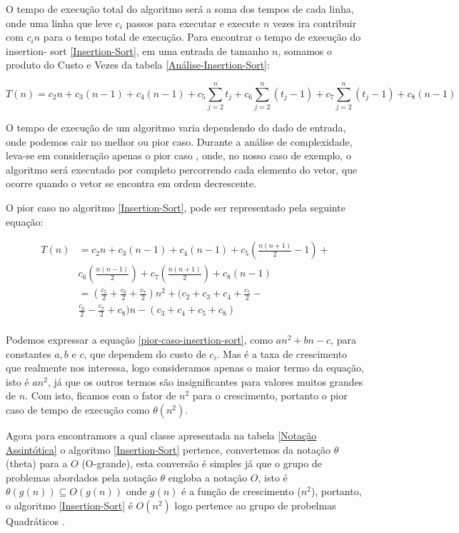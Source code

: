 \documentclass[
	12pt,				%
	openright,			%
	oneside,			%
	a4paper,			%
	english,			%
	brazil				%
	]{abntex2}
\begin{document}
O tempo de execução total do algoritmo será a soma dos tempos de cada linha, onde uma linha que leve $c_i$ passos para executar
e execute $n$ vezes ira contribuir com $c_in$ para o tempo total de execução. Para encontrar o tempo de execução do insertion-
sort \ref{Insertion-Sort}, em uma entrada de tamanho $n$, somamos o produto do Custo e Vezes da tabela \ref{Análise-Insertion-Sort}:

\begin{equation}
	\label{tempo-execução-insertion-sort}
	T(n) = c_2n + c_3(n - 1) + c_4(n - 1) + c_5\sum_{j=2}^{n} t_j + c_6\sum_{j=2}^{n} (t_j - 1) + c_7\sum_{j=2}^{n} (t_j - 1) + c_8(n-1)
\end{equation}

O tempo de execução de um algoritmo varia dependendo do dado de entrada, onde podemos cair no melhor ou pior caso. Durante a
análise de complexidade, leva-se em consideração apenas o pior caso \cite{introductionAlgorthms}, onde, no nosso caso de exemplo, 
o algoritmo será executado por completo percorrendo cada elemento do vetor, que ocorre quando o vetor se encontra em ordem decrescente.

O pior caso no algoritmo \ref{Insertion-Sort}, pode ser representado pela seguinte equação:

\begin{equation}
	\label{pior-caso-insertion-sort}
	\begin{split}
		T(n)& = c_2n + c_3(n - 1) + c_4(n - 1) + c_5(\frac{n(n+1)}{2}-1) + \\
			&   c_6(\frac{n(n-1)}{2}) + c_7(\frac{n(n+1)}{2}) + c_8(n-1) \\
			& = (\frac{c_5}{2} + \frac{c_6}{2} + \frac{c_7}{2})n^2 + (c_2 + c_3 + c_4 + \frac{c_5}{2} - \\
			&   \frac{c_6}{2} - \frac{c_7}{2} + c_8)n - (c_3 + c_4 + c_5 + c_8) \\
	\end{split}
\end{equation}

Podemos expressar a equação \ref{pior-caso-insertion-sort}, como $an^2 + bn - c$, para constantes $a, b$ e $c$, que dependem do custo de
$c_i$. Mas é a taxa de crescimento que realmente nos interessa, logo consideramos apenas o maior termo da equação, isto é $an^2$, já que
os outros termos são insignificantes para valores muitos grandes de $n$. Com isto, ficamos com o fator de $n^2$ para o crescimento, portanto
o pior caso de tempo de execução como $\theta(n^2)$.

Agora para encontramors a qual classe apresentada na tabela \ref{Notação Assintótica} o algoritmo \ref{Insertion-Sort} pertence, convertemos
da notação $\theta$ (theta) para a $O$ (O-grande), esta conversão é simples já que o grupo de problemas abordados pela notação $\theta$ engloba
a notação $O$, isto é $\theta(g(n)) \subseteq O(g(n))$ onde $g(n)$ é a função de crescimento ($n^2$), portanto, o algoritmo \ref{Insertion-Sort}
é $O(n^2)$ logo pertence ao grupo de probelmas Quadráticos \cite{introductionAlgorthms}.
\end{document}
